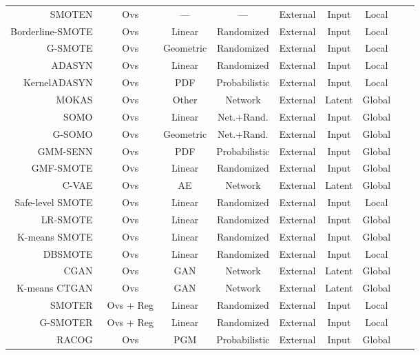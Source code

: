 \begin{longtable}{rcccccccc}
    SMOTEN~\cite{chawla2002smote} & Ovs & --- & --- & External & Input & Local \\
    Borderline-SMOTE~\cite{han2005borderline} & Ovs & Linear & Randomized & External & Input & Local \\
    G-SMOTE~\cite{douzas2019geometric} & Ovs & Geometric & Randomized & External & Input & Local \\
    ADASYN~\cite{he2008adasyn} & Ovs & Linear & Randomized & External & Input & Local \\
    KernelADASYN~\cite{tang2015kerneladasyn} & Ovs & PDF & Probabilistic & External & Input & Local \\
    MOKAS~\cite{lin2017minority} & Ovs & Other & Network & External & Latent & Global \\
    SOMO~\cite{douzas2017self} & Ovs & Linear & Net.+Rand. & External & Input & Global \\
    G-SOMO~\cite{douzas2021g} & Ovs & Geometric & Net.+Rand. & External & Input & Global \\
    GMM-SENN~\cite{xing2022predict} & Ovs & PDF & Probabilistic & External & Input & Global \\
    GMF-SMOTE~\cite{xu2022synthetic} & Ovs & Linear & Randomized & External & Input & Global \\
    C-VAE~\cite{dai2019generative} & Ovs & AE & Network & External & Latent & Global \\
    Safe-level SMOTE~\cite{bunkhumpornpat2009safe} & Ovs & Linear & Randomized & External & Input & Local \\
    LR-SMOTE~\cite{liang2020lr} & Ovs & Linear & Randomized & External & Input & Global \\
    K-means SMOTE~\cite{douzas2018improving} & Ovs & Linear & Randomized & External & Input & Global\\
    DBSMOTE~\cite{bunkhumpornpat2012dbsmote} & Ovs & Linear & Randomized & External & Input & Local\\
    CGAN~\cite{douzas2018effective} & Ovs & GAN & Network & External & Latent & Global \\
    K-means CTGAN~\cite{an2021k} & Ovs & GAN & Network & External & Latent & Global \\
    SMOTER~\cite{torgo2013smote} & Ovs + Reg & Linear & Randomized & External & Input & Local \\
    G-SMOTER~\cite{camacho2022geometric} & Ovs + Reg & Linear & Randomized & External & Input & Local \\
    RACOG~\cite{das2014racog} & Ovs & PGM & Probabilistic & External & Input & Global \\

\end{longtable}
